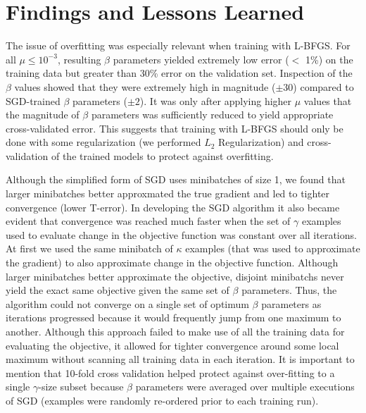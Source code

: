 \documentclass[10pt]{article}
\begin{document}
\section{Findings and Lessons Learned}
\label{sec:conclusion}

The issue of overfitting was especially relevant when training with L-BFGS. For all $\mu \leq 10^{-3}$, resulting $\beta$ parameters yielded extremely low error ($<$ 1\%) on the training data but greater than 30\% error on the validation set. Inspection of the $\beta$ values showed that they were extremely high in magnitude ($\pm 30$) compared to SGD-trained $\beta$ parameters ($\pm 2$). It was only after applying higher $\mu$ values that the magnitude of $\beta$ parameters was sufficiently reduced to yield appropriate cross-validated error. This suggests that training with L-BFGS should only be done with some regularization (we performed $L_2$ Regularization) and cross-validation of the trained models to protect against overfitting.

Although the simplified form of SGD uses minibatches of size 1, we found that larger minibatches better approxmated the true gradient and led to tighter convergence (lower T-error). In developing the SGD algorithm it also became evident that convergence was reached much faster when the set of $\gamma$ examples used to evaluate change in the objective function was constant over all iterations. At first we used the same minibatch of $\kappa$ examples (that was used to approximate the gradient) to also approximate change in the objective function. Although larger minibatches better approximate the objective, disjoint minibatchs never yield the exact same objective given the same set of $\beta$ parameters. Thus, the algorithm could not converge on a single set of optimum $\beta$ parameters as iterations progressed because it would frequently jump from one maximum to another. Although this approach failed to make use of all the training data for evaluating the objective, it allowed for tighter convergence around some local maximum without scanning all training data in each iteration. It is important to mention that 10-fold cross validation helped protect against over-fitting to a single $\gamma$-size subset because $\beta$ parameters were averaged over multiple executions of SGD (examples were randomly re-ordered prior to each training run).





\end{document}
